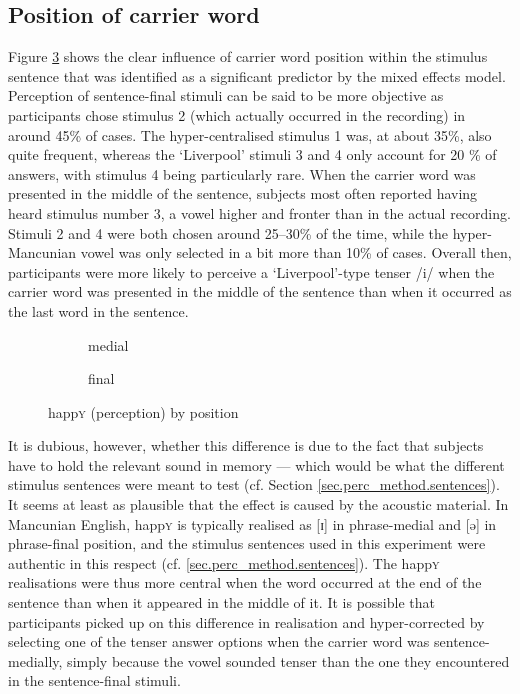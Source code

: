 \subsection{Position of carrier word}
\label{sec.perc_res.happy.position}

Figure \ref{fig.bar.happy.tot.ext.pos} shows the clear influence of carrier word position within the stimulus sentence that was identified as a significant predictor by the mixed effects model.
Perception of sentence-final stimuli can be said to be more objective as participants chose stimulus 2 (which actually occurred in the recording) in around 45\% of cases.
The hyper-centralised stimulus 1 was, at about 35\%, also quite frequent, whereas the `Liverpool' stimuli 3 and 4 only account for 20 \% of answers, with stimulus 4 being particularly rare.
When the carrier word was presented in the middle of the sentence, subjects most often reported having heard stimulus number 3, a vowel higher and fronter than in the actual recording.
Stimuli 2 and 4 were both chosen around 25--30\% of the time, while the hyper-Mancunian vowel was only selected in a bit more than 10\% of cases.
Overall then, participants were more likely to perceive a `Liverpool'-type tenser /i/ when the carrier word was presented in the middle of the sentence than when it occurred as the last word in the sentence.

\begin{figure}[h]
	\centering
	\begin{subfigure}{0.49\textwidth}
		\centering
			\resizebox{\linewidth}{!}{} 
		\caption{medial}
		\label{fig.bar.happy.tot.ext.med}
	\end{subfigure}
	\begin{subfigure}{0.49\textwidth}
		\centering
			\resizebox{\linewidth}{!}{} 
		\caption{final}
		\label{fig.bar.happy.tot.ext.fin}
	\end{subfigure}
	\caption{happ\textsc{y} (perception) by position}
	\label{fig.bar.happy.tot.ext.pos}
\end{figure}

It is dubious, however, whether this difference is due to the fact that subjects have to hold the relevant sound in memory --- which would be what the different stimulus sentences were meant to test (cf. Section \ref{sec.perc_method.sentences}).
It seems at least as plausible that the effect is caused by the acoustic material.
In Mancunian English, happ\textsc{y} is typically realised as [ɪ] in phrase-medial and [ə] in phrase-final position, and the stimulus sentences used in this experiment were authentic in this respect (cf. \ref{sec.perc_method.sentences}).
The happ\textsc{y} realisations were thus more central when the word occurred at the end of the sentence than when it appeared in the middle of it.
It is possible that participants picked up on this difference in realisation and hyper-corrected by selecting one of the tenser answer options when the carrier word was sentence-medially, simply because the vowel sounded tenser than the one they encountered in the sentence-final stimuli.

